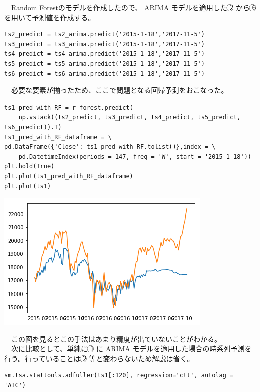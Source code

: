 \documentclass{scrartcl}
\begin{document}
　Random Forestのモデルを作成したので、 ARIMA モデルを適用した \textcircled{\scriptsize 2} から \textcircled{\scriptsize 6} を用いて予測値を作成する。\\
\begin{verbatim}
ts2_predict = ts2_arima.predict('2015-1-18','2017-11-5')
ts3_predict = ts3_arima.predict('2015-1-18','2017-11-5')
ts4_predict = ts4_arima.predict('2015-1-18','2017-11-5')
ts5_predict = ts5_arima.predict('2015-1-18','2017-11-5')
ts6_predict = ts6_arima.predict('2015-1-18','2017-11-5')
\end{verbatim}

　必要な要素が揃ったため、ここで問題となる回帰予測をおこなった。\\
\begin{verbatim}
ts1_pred_with_RF = r_forest.predict(
    np.vstack((ts2_predict, ts3_predict, ts4_predict, ts5_predict, ts6_predict)).T)
ts1_pred_with_RF_dataframe = \
pd.DataFrame({'Close': ts1_pred_with_RF.tolist()},index = \
    pd.DatetimeIndex(periods = 147, freq = 'W', start = '2015-1-18'))
plt.hold(True)
plt.plot(ts1_pred_with_RF_dataframe)
plt.plot(ts1)
\end{verbatim}

\begin{center}
\includegraphics[width=.9\linewidth]{./obipy-resources/MOXXjm.png}
\end{center}

　この図を見るとこの手法はあまり精度が出ていないことがわかる。\\
　次に比較として、単純に \textcircled{\scriptsize 1} に ARIMA モデルを適用した場合の時系列予測を行う。行っていることは \textcircled{\scriptsize 2} 等と変わらないため解説は省く。\\
\begin{verbatim}
sm.tsa.stattools.adfuller(ts1[:120], regression='ctt', autolag = 'AIC')
\end{verbatim}
\end{document}
